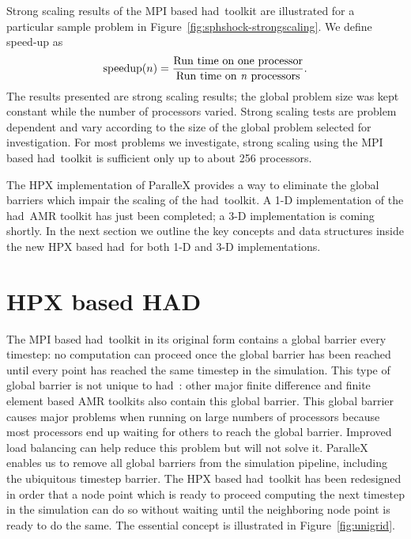 \documentclass[prd,aps,showpacs,nofootinbib,floats,floatfix,twocolumn,letterpaper]{revtex4}
\newcommand{\had}{{\sc had}}
\begin{document}
Strong scaling results of the MPI based \had\ toolkit are illustrated for a particular sample problem
in Figure~\ref{fig:sphshock-strongscaling}.  We define speed-up as  
\begin{eqnarray*}
{\rm speedup}(n) = \frac{{\rm Run~time~on~one~processor}}{{\rm Run~time~on~{\it n}~processors}}.
\end{eqnarray*}
The results presented are 
strong scaling results; the global problem size was kept constant while the
number of processors varied.  Strong scaling tests are problem dependent and vary
according to the size of the global problem selected for investigation.  For most problems
we investigate, strong scaling using the MPI based \had\ toolkit is sufficient only up to about 256 processors.

The HPX implementation of ParalleX provides a way to eliminate the global barriers which 
impair the scaling of the \had\ toolkit.   A 1-D implementation of the \had\ AMR toolkit has
just been completed; a 3-D implementation is coming shortly.  In the next section we 
outline the key concepts and data structures inside the new HPX based \had\ 
for both 1-D and 3-D implementations.

\vspace{0.4cm}
%
%
\section{HPX based HAD}
\label{sec:hpx_had}

The MPI based \had\ toolkit in its original form contains a global barrier every timestep: no
computation can proceed once the global barrier has been reached until every point has reached
the same timestep in the simulation.  This type of global barrier is not unique to \had\ : other
major finite difference and finite element based AMR toolkits also contain this global barrier.
This global barrier causes major problems when running on large numbers of processors because
most processors end up waiting for others to reach the global barrier.  Improved load balancing
can help reduce this problem but will not solve it.  ParalleX enables us to remove all 
global barriers from the simulation pipeline, including the ubiquitous timestep barrier.  The
HPX based \had\ toolkit has been redesigned in order that a node point which is ready to proceed 
computing the next
timestep in the simulation can do so without waiting until the neighboring node point is ready to do the same. 
The essential concept is illustrated in Figure~\ref{fig:unigrid}.
\end{document}
